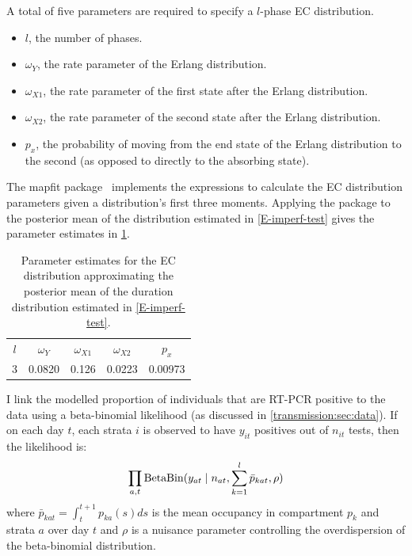 \documentclass[thesis.tex]{subfiles}
\begin{document}
A total of five parameters are required to specify a $l$-phase EC distribution.
\begin{itemize}
    \item $l$, the number of phases.
    \item $\omega_Y$, the rate parameter of the Erlang distribution.
    \item $\omega_{X1}$, the rate parameter of the first state after the Erlang distribution.
    \item $\omega_{X2}$, the rate parameter of the second state after the Erlang distribution.
    \item $p_x$, the probability of moving from the end state of the Erlang distribution to the second (as opposed to directly to the absorbing state).
\end{itemize}

The mapfit package~\autocite{mapfit} implements the expressions to calculate the EC distribution parameters given a distribution's first three moments.
Applying the package to the posterior mean of the distribution estimated in \cref{E-imperf-test} gives the parameter estimates in \cref{SEIR:table:ec-params}.
\begin{table}
    \centering
    \begin{tabular}{c c c c c}
        $l$ & $\omega_Y$ & $\omega_{X1}$ & $\omega_{X2}$ & $p_x$ \\
        3 & 0.0820 & 0.126 & 0.0223 & 0.00973  \\
    \end{tabular}
    \caption{Parameter estimates for the EC distribution approximating the posterior mean of the duration distribution estimated in \cref{E-imperf-test}.}
    \label{SEIR:table:ec-params}
\end{table}

I link the modelled proportion of individuals that are RT-PCR positive to the data using a beta-binomial likelihood (as discussed in \cref{transmission:sec:data}).
If on each day $t$, each strata $i$ is observed to have $y_{it}$ positives out of $n_{it}$ tests, then the likelihood is:
\begin{align}
    \prod_{a,t} \operatorname{BetaBin} (y_{at} \mid n_{at}, \sum_{k=1}^l \bar{p}_{kat}, \rho)
    \label{SEIR:eq:likelihood}
\end{align}
where $\bar{p}_{kat} = \int_{t}^{t+1} p_{ka}(s) ds$ is the mean occupancy in compartment $p_k$ and strata $a$ over day $t$ and $\rho$ is a nuisance parameter controlling the overdispersion of the beta-binomial distribution.
\end{document}
